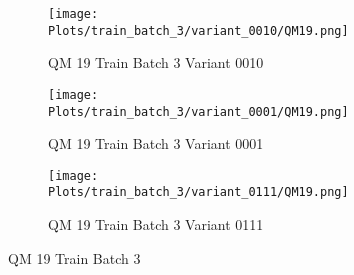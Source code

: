 \documentclass{DissertateFigs}
\begin{document}
\begin{figure}[t!]
\medskip

    \begin{subfigure}{0.47\textwidth}
    \texttt{[image: Plots/train\_batch\_3/variant\_0010/QM19.png]}
    \caption{QM 19 Train Batch 3 Variant 0010}
    \end{subfigure}
    \begin{subfigure}{0.47\textwidth}
    \texttt{[image: Plots/train\_batch\_3/variant\_0001/QM19.png]}
    \caption{QM 19 Train Batch 3 Variant 0001}
    \end{subfigure}

\medskip

    \begin{subfigure}{0.47\textwidth}
    \texttt{[image: Plots/train\_batch\_3/variant\_0111/QM19.png]}
    \caption{QM 19 Train Batch 3 Variant 0111}
    \end{subfigure}
\caption{QM 19 Train Batch 3}
    \end{figure}
\clearpage

\end{document}
